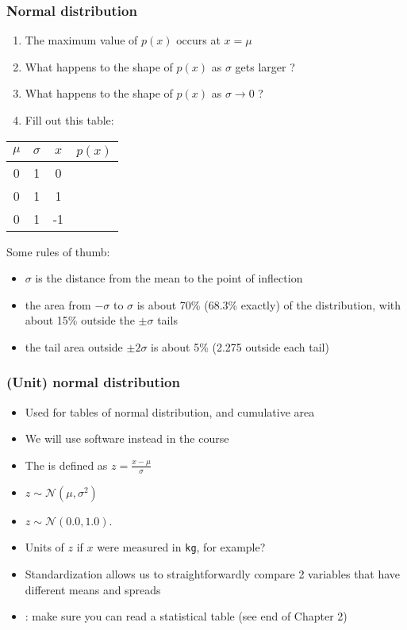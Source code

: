 \begin{frame}\frametitle{Normal distribution}
	\begin{enumerate}
		\item	The maximum value of $p(x)$ occurs at $x = \mu$
		\item	What happens to the shape of $p(x)$ as $\sigma$ gets larger ?
		\item	What happens to the shape of $p(x)$ as $\sigma \rightarrow 0$ ?
		\item	Fill out this table:
	\end{enumerate}
	\begin{center}
		\begin{tabular}{|c|c|c|c|}\hline
			$\mu$		&	$\sigma$ 	&	$x$		&	$p(x)$\\ \hline
			0 			&  	1			& 	0 		&		  \\ \hline
			0 			&	1			& 	1		&  		  \\ \hline
			0 			&	1			& 	-1		&  		  \\ \hline
		\end{tabular}
		
	\end{center}
	Some rules of thumb:
	\begin{itemize}
		\item	$\sigma$ is the distance from the mean to the point of inflection
		\item	the area from $-\sigma$ to $\sigma$ is about 70\% (68.3\% exactly) of the distribution, with about 15\% outside the $\pm \sigma$ tails
		\item	the tail area outside $\pm 2\sigma$ is about 5\% (2.275 outside each tail)
	\end{itemize}
\end{frame}

\begin{frame}\frametitle{(Unit) normal distribution}
	\begin{itemize}
		\item	Used for tables of normal distribution, and cumulative area
		\item	We will use software instead in the course
		\item	The {\color{purple}{standard form}} is defined as $ z = \displaystyle \frac{x - \mu}{\sigma} $
		\item	$z \sim \mathcal{N}(\mu, \sigma^2)$ \hfill {\color{myOrange}{$\longleftarrow$ do not use the standard deviation in here}}
		\item	$z \sim \mathcal{N}(0.0, 1.0)$.
		\item	Units of $z$ if $x$ were measured in \texttt{kg}, for example? 
		\item	Standardization allows us to straightforwardly compare 2 variables that have different means and spreads
		\item	{\color{red}{Recommendation}}: make sure you can read a statistical table (see end of Chapter 2)
	\end{itemize}
\end{frame}

